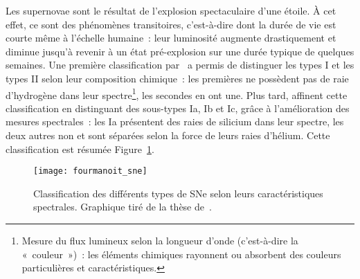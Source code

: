 \documentclass[../main/main.tex]{subfiles}
\begin{document}
Les supernovae sont le résultat de l'explosion spectaculaire d'une étoile. À cet
effet, ce sont des phénomènes transitoires, c'est-à-dire dont la durée de vie
est courte même à l'échelle humaine~: leur luminosité augmente drastiquement et
diminue jusqu'à revenir à un état pré-explosion sur une durée typique de
quelques semaines. Une première classification par~\cite{minkowski1941} a permis
de distinguer les types I et les types II selon leur composition chimique~: les
premières ne possèdent pas de raie d'hydrogène dans leur spectre\footnote{Mesure
    du flux lumineux selon la longueur d'onde (c'est-à-dire la «~couleur~»)~:
    les éléments chimiques rayonnent ou absorbent des couleurs particulières et
caractéristiques.}, les secondes en ont une. Plus tard, \cite{elias1985}
affinent cette classification en distinguant des sous-types Ia, Ib et Ic,
grâce à l'amélioration des mesures spectrales~: les Ia présentent des raies
de silicium dans leur spectre, les deux autres non et sont séparées selon la
force de leurs raies d'hélium. Cette classification est résumée
Figure~\ref{fig:sne_class}.

\begin{figure}[ht]
    \centering
    \texttt{[image: fourmanoit\_sne]}
    \caption[Classification des différents types de SNe selon leurs
    caractéristiques spectrales]{Classification des différents types de SNe selon
        leurs caractéristiques spectrales. Graphique tiré de la thèse
    de~\cite{fourmanoit2010}.}\label{fig:sne_class}
\end{figure}
\end{document}
